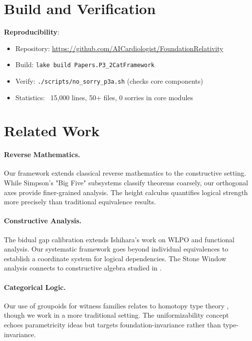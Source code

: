 \documentclass[11pt]{article}
\theoremstyle{plain}
\theoremstyle{definition}
\begin{document}
\section{Build and Verification}

\begin{formalbox}
\textbf{Reproducibility}:
\begin{itemize}
\item Repository: \url{https://github.com/AICardiologist/FoundationRelativity}
\item Build: \texttt{lake build Papers.P3\_2CatFramework}
\item Verify: \texttt{./scripts/no\_sorry\_p3a.sh} (checks core components)
\item Statistics: ~15,000 lines, 50+ files, 0 sorries in core modules
\end{itemize}
\end{formalbox}

\section{Related Work}

\paragraph{Reverse Mathematics.} Our framework extends classical reverse mathematics \cite{Simpson2009} to the constructive setting. While Simpson's "Big Five" subsystems classify theorems coarsely, our orthogonal axes provide finer-grained analysis. The height calculus quantifies logical strength more precisely than traditional equivalence results.

\paragraph{Constructive Analysis.} The bidual gap calibration extends Ishihara's work \cite{Ishihara2006} on WLPO and functional analysis. Our systematic framework goes beyond individual equivalences to establish a coordinate system for logical dependencies. The Stone Window analysis connects to constructive algebra studied in \cite{MinesRichmanRuitenburg1988}.

\paragraph{Categorical Logic.} Our use of groupoids for witness families relates to homotopy type theory \cite{HoTTBook}, though we work in a more traditional setting. The uniformizability concept echoes parametricity ideas but targets foundation-invariance rather than type-invariance.
\end{document}
